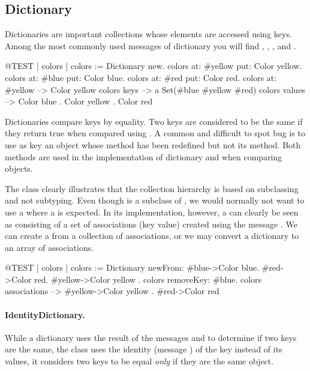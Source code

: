 \documentclass[a4paper,10pt,twoside]{book}
\begin{document}
\subsection{Dictionary}
Dictionaries are important collections whose elements are accessed using keys. 
Among the most commonly used messages of dictionary you will find , , ,  and .

\begin{code}{@TEST | colors |}
colors := Dictionary new.
colors at: #yellow put: Color yellow.
colors at: #blue put: Color blue.
colors at: #red put: Color red.
colors at: #yellow --> Color yellow
colors keys          --> a Set(#blue #yellow #red)
colors values       --> {Color blue . Color yellow . Color red}
\end{code}

Dictionaries compare keys by equality. Two keys are considered to be the same if they return true when compared using \ct{=}. A common and difficult to spot bug is to use as key an object whose \ct{=} method has been redefined but not its  method. Both methods are used in the implementation of dictionary and when comparing objects.

The class  clearly illustrates that the collection hierarchy is based on subclassing and not subtyping.  Even though  is a subclass of , we would normally not want to use a  where a  is expected. In its implementation, however, a  can clearly be seen as consisting of a set of associations (key value) created using the message . We can create a  from a collection of associations, or we may convert a dictionary to an array of associations.

\begin{code}{@TEST | colors |}
colors := Dictionary newFrom: { #blue->Color blue. #red->Color red. #yellow->Color yellow }.
colors removeKey: #blue.
colors associations --> {#yellow->Color yellow . #red->Color red}
\end{code}

\paragraph{IdentityDictionary.}
While a dictionary uses the result of the messages \ct{=} and  to determine if two keys are the same, the class  uses the identity (message ) of the key instead of its values, \ie it considers two keys to be equal \emph{only} if they are the same object.
\end{document}
